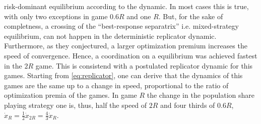 \documentclass[11pt]{article}
\begin{document}
risk-dominant equilibrium according to the dynamic.
In most cases this is true, with only two exceptions in game $0.6R$ 
and one $R$.
But, for the sake of completness, a crossing of the  
``best-response separatrix'' \parencite{battalio_optimization_2001} i.e. 
mixed-strategy equilibrium, can not happen in the deterministic replicator 
dynamic. Furthermore, as they conjectured, a larger optimization premium 
increases the speed of convergence. Hence, a coordination on a equilibrium 
was achieved fastest in the $2R$ game. This is consistend with a 
postulated replicator dynamic for this games. Starting from 
\eqref{eq:replicator}, one can derive that the dynamics of this 
games are the same up to a change in speed, proportional to the ratio of 
optimization premia of the games. In game $R$ the change in the population share
playing strategy one is, thus, half the speed of $2R$ and four thirds of $0.6R$,
$\dot{x}_{R} = \frac 12 \dot{x}_{2R} = \frac{4}{3}\dot{x}_R$.
\end{document}

